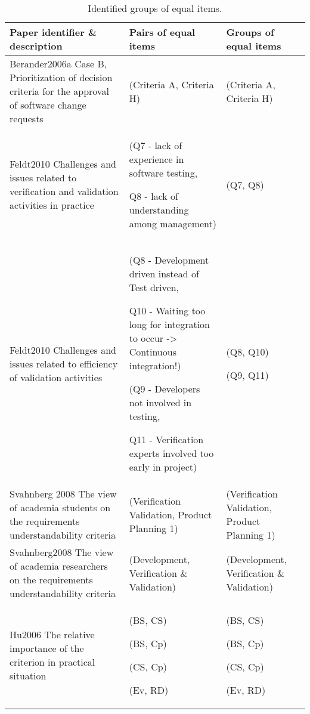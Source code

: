 %
\begin{table*}
	\scriptsize
\caption{\label{tab:ECVresult-1}Identified groups of equal items.}


\begin{tabular}{
|>{\centering}p{}
|>{\centering}p{}
|>{\centering}p{}|}
\hline 
Paper identifier \& description  & Pairs of equal items  & Groups of equal items\tabularnewline
\hline

Berander2006a \cite{Berander2006a} Case B, Prioritization of decision criteria for the approval of software
change requests  & (Criteria A, Criteria H)  & (Criteria A, Criteria H)\tabularnewline
\hline

Feldt2010 \cite{Feldt2010} Challenges and issues related to verification and validation activities in practice & 
(Q7 - lack of experience in software testing, 

Q8 - lack of understanding among management) &
(Q7, Q8)\tabularnewline
\hline 

Feldt2010 \cite{Feldt2010} Challenges and issues related to efficiency of validation activities &
(Q8 - \textquotedbl{}Development driven\textquotedbl{} instead of \textquotedbl{}Test driven\textquotedbl{},

Q10 - Waiting too long for integration to occur -> Continuous integration!) 

(Q9 - Developers not involved in testing, 

Q11 - Verification experts involved too early in project) &

(Q8, Q10) 

(Q9, Q11)
\tabularnewline
\hline 


Svahnberg 2008 \cite{Svahnberg2008} The view of academia students on the requirements understandability
criteria  & (Verification Validation, Product Planning 1)  & (Verification Validation, Product Planning 1)\tabularnewline
\hline 
Svahnberg2008 \cite{Svahnberg2008} The view of academia researchers on the requirements understandability
criteria  & (Development, Verification \& Validation) & (Development, Verification \& Validation)\tabularnewline
\hline 
Hu2006\cite{Hu2006} The relative importance of the criterion in practical situation & (BS, CS)

(BS, Cp)

(CS, Cp)

(Ev, RD) & (BS, CS)

(BS, Cp)

(CS, Cp)

(Ev, RD)\tabularnewline
\hline 



\end{tabular}
\end{table*}
